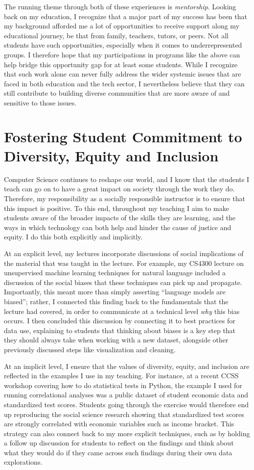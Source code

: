 \documentclass[12pt,letterpaper]{article}
\begin{document}
The running theme through both of these experiences is \emph{mentorship}.
Looking back on my education, I recognize that a major part of my success has been that my background afforded me a lot of opportunities to receive support along my educational journey, be that from family, teachers, tutors, or peers.
Not all students have such opportunities, especially when it comes to underrepresented groups.
I therefore hope that my participations in programs like the above can help bridge this opportunity gap for at least some students.
While I recognize that such work alone can never fully address the wider systemic issues that are faced in both education and the tech sector, I nevertheless believe that they can still contribute to building diverse communities that are more aware of and sensitive to those issues.

\section{Fostering Student Commitment to Diversity, Equity and Inclusion}
Computer Science continues to reshape our world, and I know that the students I teach can go on to have a great impact on society through the work they do.
Therefore, my responsibility as a socially responsible instructor is to ensure that this impact is positive.
To this end, throughout my teaching I aim to make students aware of the broader impacts of the skills they are learning, and the ways in which technology can both help and hinder the cause of justice and equity. 
I do this both explicitly and implicitly.

At an explicit level, my lectures incorporate discussions of social implications of the material that was taught in the lecture.
For example, my CS4300 lecture on unsupervised machine learning techniques for natural language included a discussion of the social biases that these techniques can pick up and propagate.
Importantly, this meant more than simply asserting ``language models are biased''; rather, I connected this finding back to the fundamentals that the lecture had covered, in order to communicate at a technical level \emph{why} this bias occurs.
I then concluded this discussion by connecting it to best practices for data use, explaining to students that thinking about biases is a key step that they should always take when working with a new dataset, alongside other previously discussed steps like visualization and cleaning.

At an implicit level, I ensure that the values of diversity, equity, and inclusion are reflected in the examples I use in my teaching.
For instance, at a recent CCSS workshop covering how to do statistical tests in Python, the example I used for running correlational analyses was a public dataset of student economic data and standardized test scores.
Students going through the exercise would therefore end up reproducing the social science research showing that standardized test scores are strongly correlated with economic variables such as income bracket.
This strategy can also connect back to my more explicit techniques, such as by holding a follow up discussion for students to reflect on the findings and think about what they would do if they came across such findings during their own data explorations.
\end{document}
